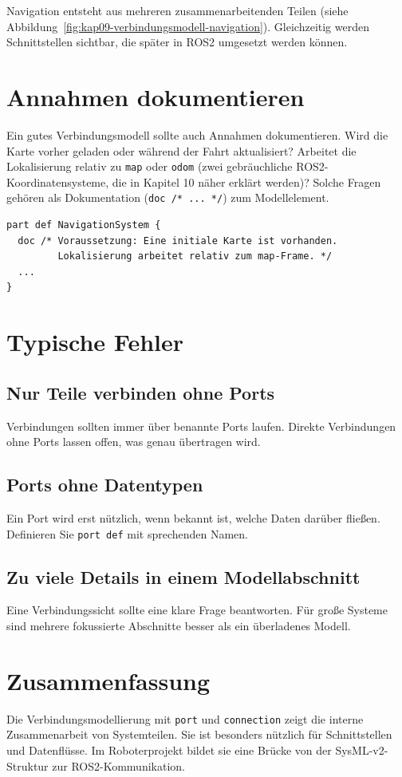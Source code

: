 Navigation entsteht aus mehreren zusammenarbeitenden Teilen (siehe Abbildung~\ref{fig:kap09-verbindungsmodell-navigation}). Gleichzeitig werden Schnittstellen sichtbar, die später in ROS2 umgesetzt werden können.

\section{Annahmen dokumentieren}
Ein gutes Verbindungsmodell sollte auch Annahmen dokumentieren. Wird die Karte vorher geladen oder während der Fahrt aktualisiert? Arbeitet die Lokalisierung relativ zu \texttt{map} oder \texttt{odom} (zwei gebräuchliche ROS2-Koordinatensysteme, die in Kapitel 10 näher erklärt werden)? Solche Fragen gehören als Dokumentation (\texttt{doc /* ... */}) zum Modellelement.

\begin{lstlisting}
part def NavigationSystem {
  doc /* Voraussetzung: Eine initiale Karte ist vorhanden.
         Lokalisierung arbeitet relativ zum map-Frame. */
  ...
}
\end{lstlisting}

\section{Typische Fehler}
\subsection{Nur Teile verbinden ohne Ports}
Verbindungen sollten immer über benannte Ports laufen. Direkte Verbindungen ohne Ports lassen offen, was genau übertragen wird.

\subsection{Ports ohne Datentypen}
Ein Port wird erst nützlich, wenn bekannt ist, welche Daten darüber fließen. Definieren Sie \texttt{port def} mit sprechenden Namen.

\subsection{Zu viele Details in einem Modellabschnitt}
Eine Verbindungssicht sollte eine klare Frage beantworten. Für große Systeme sind mehrere fokussierte Abschnitte besser als ein überladenes Modell.

\section{Zusammenfassung}
Die Verbindungsmodellierung mit \texttt{port} und \texttt{connection} zeigt die interne Zusammenarbeit von Systemteilen. Sie ist besonders nützlich für Schnittstellen und Datenflüsse. Im Roboterprojekt bildet sie eine Brücke von der SysML-v2-Struktur zur ROS2-Kommunikation.

